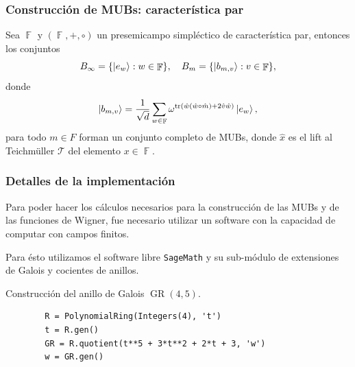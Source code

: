 \documentclass[10pt,spanish]{beamer}
\DeclareMathOperator{\F}{\mathbb{F}}
\DeclareMathOperator{\tr}{tr}
\DeclareMathOperator{\GR}{GR}
\begin{document}
  \begin{frame}
    \frametitle{Construcción de MUBs: característica par}

    \begin{theorem}
      Sea $\F$  y $(\F,+,\circ)$ un presemicampo simpléctico
      de característica par, entonces los conjuntos
      \begin{equation}
        B_\infty
        = \{\ket{e_w} : w \in \F\},
        \quad
        B_m
        = \{\ket{b_{m,v}} : v \in \F\},
      \end{equation}
      donde
      \begin{equation}
        \ket{b_{m,v}}
        = \frac{1}{\sqrt{d}} 
        \sum_{w \in \F}^{} \omega^{\tr\left( \hat w (\hat
        w\circ \hat m) + 2\hat v \hat w\right)} \ket{e_w},
      \end{equation}
      para todo $m \in F$ forman un conjunto completo de
      MUBs, donde $\hat x$ es el lift al Teichmüller
      $\mathcal T$ del elemento $x \in \F$.
    \end{theorem}

  \end{frame}

  \begin{frame}[fragile]
    \frametitle{Detalles de la implementación}

    Para poder hacer los cálculos necesarios para la
    construcción de las MUBs y de las funciones de Wigner,
    fue necesario utilizar un software con la capacidad de
    computar con campos finitos.

    \vspace{5pt}

    Para ésto utilizamos el software libre
    \texttt{SageMath} y su sub-módulo de extensiones de
    Galois y cocientes de anillos.

    \vspace{5pt}

    \begin{example}
      Construcción del anillo de Galois $\GR(4,5)$.

      \begin{verbatim}
        R = PolynomialRing(Integers(4), 't')
        t = R.gen()
        GR = R.quotient(t**5 + 3*t**2 + 2*t + 3, 'w')
        w = GR.gen()
      \end{verbatim}
    \end{example}
  \end{frame}
\end{document}
